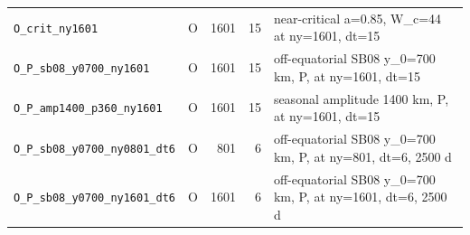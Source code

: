 {\begin{longtable}{llrrp{7.0cm}}
\texttt{O\_crit\_ny1601} & O & 1601 & 15 & near-critical a=0.85, W\_c=44 at ny=1601, dt=15\\
\texttt{O\_P\_sb08\_y0700\_ny1601} & O & 1601 & 15 & off-equatorial SB08 y\_0=700 km, P, at ny=1601, dt=15\\
\texttt{O\_P\_amp1400\_p360\_ny1601} & O & 1601 & 15 & seasonal amplitude 1400 km, P, at ny=1601, dt=15\\
\texttt{O\_P\_sb08\_y0700\_ny0801\_dt6} & O & 801 & 6 & off-equatorial SB08 y\_0=700 km, P, at ny=801, dt=6, 2500 d\\
\texttt{O\_P\_sb08\_y0700\_ny1601\_dt6} & O & 1601 & 6 & off-equatorial SB08 y\_0=700 km, P, at ny=1601, dt=6, 2500 d\\
\end{longtable}
}
